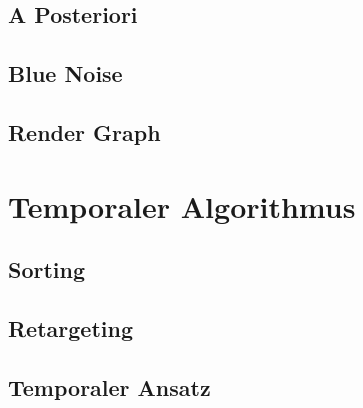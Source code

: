 \newpage
\section{A Posteriori}
\label{ch:Content2:sec:a Posteriori}


\newpage
\section{Blue Noise}
\label{ch:Content1:sec:blue noise}



\newpage
\section{Render Graph}
\label{ch:Content2:sec:Render Graph}



\newpage
\chapter{Temporaler Algorithmus}
\label{ch:Temporaler Algorithmus}


\newpage
\section{Sorting}
\label{ch:Content2:sec:Sorting}


\newpage
\section{Retargeting}
\label{ch:Content2:sec:Retargeting}


\newpage
\section{Temporaler Ansatz}
\label{ch:Content2:sec:Temporaler Ansatz}


